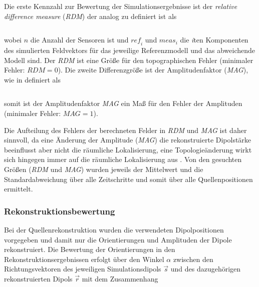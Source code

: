 Die erste Kennzahl zur Bewertung der Simulationsergebnisse ist der
\textit{relative difference measure }(\textit{RDM}) der analog zu
\cite{a5} definiert ist als

\begin{center}
\begin{supertabular}{m{14.909cm}m{1.689cm}}

\end{supertabular}
\end{center}
wobei $n$ die Anzahl der Sensoren ist und $\mathit{ref}_{i}$ und
$\mathit{meas}_{i}$ die \textit{i}ten Komponenten des simulierten
Feldvektors für das jeweilige Referenzmodell und das abweichende Modell
sind. Der \textit{RDM} ist eine Größe für den topographischen Fehler
(minimaler Fehler: $\mathit{RDM}=0$). Die zweite Differenzgröße ist der
Amplitudenfaktor (\textit{MAG}), wie in \cite{a5} definiert als

\begin{center}
\begin{supertabular}{m{14.909cm}m{1.689cm}}

\end{supertabular}
\end{center}
somit ist der Amplitudenfaktor \textit{MAG} ein Maß für den Fehler der
Amplituden (minimaler Fehler: $\mathit{MAG}=1$).

Die Aufteilung des Fehlers der berechneten Felder in \textit{RDM} und
\textit{MAG} ist daher sinnvoll, da eine Änderung der Amplitude
(\textit{MAG}) die rekonstruierte Dipolstärke beeinflusst aber nicht
die räumliche Lokalisierung, eine Topologieänderung wirkt sich hingegen
immer auf die räumliche Lokalisierung aus \cite{a2}. Von den gesuchten
Größen (\textit{RDM} und \textit{MAG}) wurden jeweils der Mittelwert
und die Standardabweichung über alle Zeitschritte und somit über alle
Quellenpositionen ermittelt.

\subsubsection{Rekonstruktionsbewertung}
Bei der Quellenrekonstruktion wurden die verwendeten Dipolpositionen
vorgegeben und damit nur die Orientierungen und Amplituden der Dipole
rekonstruiert. Die Bewertung der Orientierungen in den
Rekonstruktionsergebnissen erfolgt über den Winkel $\alpha $ zwischen
den Richtungsvektoren des jeweiligen Simulationsdipols $\vec{s}$ und
des dazugehörigen rekonstruierten Dipols $\vec{r}$ mit dem Zusammenhang

